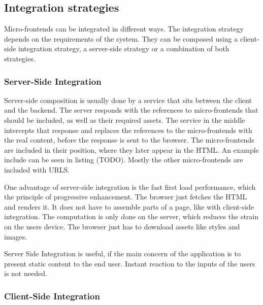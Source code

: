 \subsection{Integration strategies}

Micro-frontends can be integrated in different ways. The integration strategy depends on the requirements of the system. They can be composed using a client-side integration strategy, a server-side strategy or a combination of both strategies.

\subsubsection{Server-Side Integration}

Server-side composition is usually done by a service that sits between the client and the backend. \cite{book:2020:geers:background:micro-frontends:micro-frontends-in-action} The server responds with the references to micro-frontends that should be included, as well as their required assets. The service in the middle intercepts that response and replaces the references to the micro-frontends with the real content, before the response is sent to the browser. The micro-frontends are included in their position, where they later appear in the HTML. An example include can be seen in listing (TODO). Mostly the other micro-frontends are included with URLS.


One advantage of server-side integration is the fast first load performance, which the principle of progressive enhancement. \cite{book:2010:parker:background:micro-frontends:designing-with-progressive-enhancement} The browser just fetches the HTML and renders it. It does not have to assemble parts of a page, like with client-side integration. The computation is only done on the server, which reduces the strain on the users device. \cite{book:2020:geers:background:micro-frontends:micro-frontends-in-action} The browser just has to download assets like styles and images.


Server Side Integration is useful, if the main concern of the application is to present static content to the end user. Instant reaction to the inputs of the users is not needed. \cite{book:2020:geers:background:micro-frontends:micro-frontends-in-action}

\subsubsection{Client-Side Integration}

